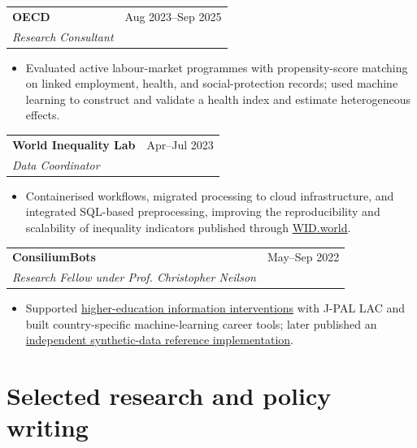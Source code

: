 \documentclass[10pt,letterpaper]{article}
\makeatletter
\newcommand{\cvrole}[4]{%
  \begin{tabularx}{\textwidth}{@{}>{\raggedright\arraybackslash}X>{\raggedleft\arraybackslash}p{1.5in}@{}}
    \textbf{\color{ink}#1} & \small{#2} \\
    \textit{#3} & \hfill\makebox[0pt][r]{\textit{\small{#4}}}
  \end{tabularx}
  \vspace{0pt}
}
\newcommand{\rolebreak}{\vspace{8pt}}
\makeatother
\begin{document}
\cvrole{OECD}{Aug 2023--Sep 2025}{Research Consultant}{Paris, France / Ljubljana, Slovenia}
\begin{itemize}
  \item Evaluated active labour-market programmes with propensity-score matching on linked employment, health, and social-protection records; used machine learning to construct and validate a health index and estimate heterogeneous effects.
\end{itemize}
\rolebreak

\cvrole{World Inequality Lab}{Apr--Jul 2023}{Data Coordinator}{Paris, France}
\begin{itemize}
  \item Containerised workflows, migrated processing to cloud infrastructure, and integrated SQL-based preprocessing, improving the reproducibility and scalability of inequality indicators published through \href{https://wid.world/world}{WID.world}.
\end{itemize}
\rolebreak

\cvrole{ConsiliumBots}{May--Sep 2022}{Research Fellow under Prof. Christopher Neilson}{Santiago, Chile / New York, NY, USA}
\begin{itemize}
  \item Supported \href{https://www.decidiendofuturomejor.com/}{higher-education information interventions} with J-PAL LAC and built country-specific machine-learning career tools; later published an \href{https://github.com/mkmacho/constrained-slate-recommender}{independent synthetic-data reference implementation}.
\end{itemize}

\section{Selected research and policy writing}
\end{document}
